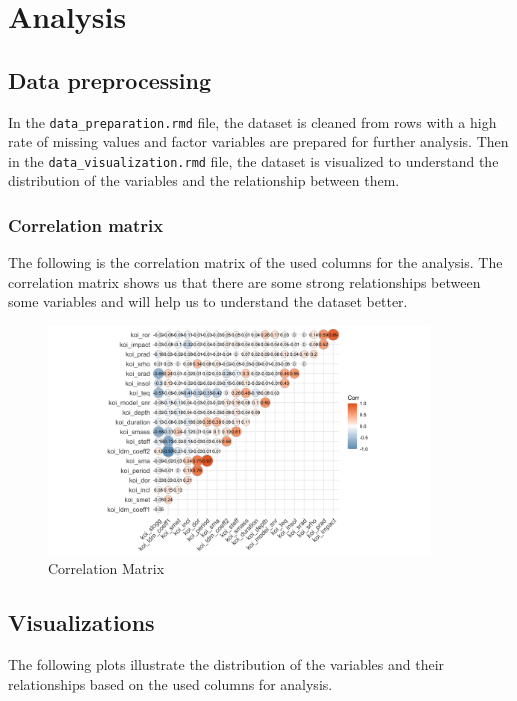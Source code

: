 \chapter{Analysis} 
\section{Data preprocessing}
In the \texttt{data\_preparation.rmd} file, the dataset is cleaned from rows with a high rate of missing values and factor variables are prepared for further analysis. Then in the \texttt{data\_visualization.rmd} file, the dataset is visualized to understand the distribution of the variables and the relationship between them.
\subsection{Correlation matrix}
The following is the correlation matrix of the used columns for the analysis. The correlation matrix shows us that there are some strong relationships between some variables and will help us to understand the dataset better.
\begin{figure}[H]
    \centering
    \includegraphics[width=0.9\textwidth]{Immagini/cm.png}
    \caption{Correlation Matrix}
\end{figure}

\section{Visualizations}
The following plots illustrate the distribution of the variables and their relationships based on the used columns for analysis.


